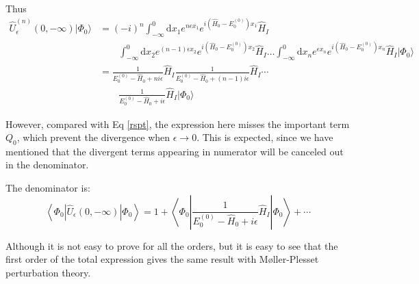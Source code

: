 Thus
\begin{equation}
	\begin{aligned}
		\hat{U}_{\epsilon}^{(n)}(0,-\infty) | \Phi_{0} \rangle&=(-i)^{n} \int_{-\infty}^{0} \mathrm{d} x_{1} e^{n \epsilon x_{1}} e^{i\left(\hat{H}_{0}-E_{0}^{(0)}\right) x_{1}} \hat{H}_{I}
		\\ 
		&\qquad {\int_{-\infty}^{0} \mathrm{d} x_{2} e^{(n-1) \epsilon x_{2}} e^{i\left(\hat{H}_{0}-E_{0}^{(0)}\right) x_{2}} \hat{H}_{I} \ldots \int_{-\infty}^{0} \mathrm{d} x_{n} e^{\epsilon x_{n}} e^{i\left(\hat{H}_{0}-E_{0}^{(0)}\right) x_{n}} \hat{H}_{I} | \Phi_{0} \rangle}
		\\
		&={\frac{1}{E_{0}^{(0)}-\hat{H}_{0}+n i \epsilon} \hat{H}_{I}}
		{\frac{1}{E_{0}^{(0)}-\hat{H}_{0}+(n-1) i \epsilon} \hat{H}_{I}} \cdots
		\\
		&\qquad \frac{1}{E_{0}^{(0)}-\hat{H}_{0}+i \epsilon} \hat{H}_{I} | \Phi_{0} \rangle
	\end{aligned}
\end{equation}

However, compared with Eq \ref{rspt}, the expression here misses the important term $Q_0$, which prevent the divergence when $\epsilon \rightarrow 0$.
This is expected, since we have mentioned that the divergent terms appearing in numerator will be canceled out in the denominator.

The denominator is:
\begin{equation}
	\left\langle\Phi_{0}\left|\hat{U}_{\epsilon}(0,-\infty)\right| \Phi_{0}\right\rangle= 1+\left\langle\Phi_{0}\left|\frac{1}{E_{0}^{(0)}-\hat{H}_{0}+i \epsilon} \hat{H}_{I}\right| \Phi_{0}\right\rangle+\cdots
\end{equation}

Although it is not easy to prove for all the orders, but it is easy to see that the first order of the total expression gives the same result with M{\o}ller-Plesset perturbation theory.


